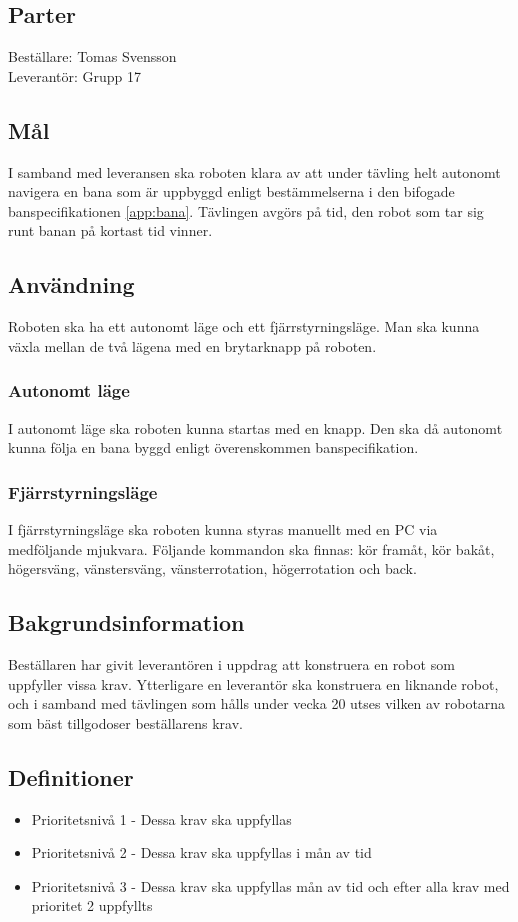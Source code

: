 \documentclass[a4paper,12pt]{article}
\begin{document}
\subsection{Parter}
Beställare: Tomas Svensson \\
Leverantör: Grupp 17


\subsection{Mål}
I samband med leveransen ska roboten klara av att under tävling helt autonomt navigera
en bana som är uppbyggd enligt bestämmelserna i den bifogade banspecifikationen \ref{app:bana}. 
 Tävlingen avgörs på tid, den robot som tar sig runt banan på kortast tid vinner.

\subsection{Användning}
Roboten ska ha ett autonomt läge och ett fjärrstyrningsläge.
Man ska kunna växla mellan de två lägena med en brytarknapp på roboten.

\subsubsection{Autonomt läge}
I autonomt läge ska roboten kunna startas med en knapp. Den ska då autonomt kunna följa en bana byggd enligt överenskommen banspecifikation.

\subsubsection{Fjärrstyrningsläge}
I fjärrstyrningsläge ska roboten kunna styras manuellt med en PC via medföljande mjukvara.
Följande kommandon ska finnas: kör framåt, kör bakåt, högersväng, vänstersväng, vänsterrotation, högerrotation och back. 

\subsection{Bakgrundsinformation}
Beställaren har givit leverantören i uppdrag att konstruera en robot som uppfyller vissa krav.
Ytterligare en leverantör ska konstruera en liknande robot,
och i samband med tävlingen som hålls under vecka 20 utses vilken av robotarna som bäst tillgodoser beställarens krav.

\subsection{Definitioner} \label{DEF}
\begin{itemize}
\item Prioritetsnivå 1 - Dessa krav ska uppfyllas
\item Prioritetsnivå 2 - Dessa krav ska uppfyllas i mån av tid
\item Prioritetsnivå 3 - Dessa krav ska uppfyllas mån av tid och efter alla krav med prioritet 2 uppfyllts
\end{itemize}
\end{document}
